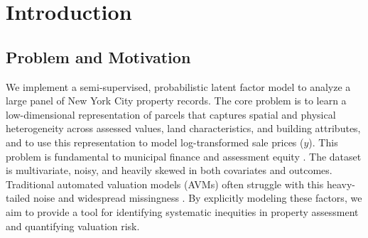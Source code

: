 \documentclass{article}
\begin{document}

\begin{abstract}
This project addresses the problem of urban property valuation in the presence of pervasive missingness and heavy-tailed noise. Accurate, uncertainty-aware valuations are critical for equitable property taxation and urban planning, as they help identify systematic assessment errors that may disproportionately affect specific neighborhoods. Our strategy involves implementing a semi-supervised extension of the Missing-data Importance-Weighted Autoencoder (MIWAE), trained on 120,000 New York City properties. We employ a mixture of Student-$t$ priors over the latent variables to accommodate the multimodality and extreme residuals characteristic of real estate data. Results show that this probabilistic framework yields informative point predictions while providing uncertainty estimates and interpretable latent structures. Quantitatively, we benchmark the generative model against gradient-boosted trees using held-out predictive metrics. Qualitatively, we visualize the latent variables to interpret the discovered structure. The broader aim is to demonstrate that principled probabilistic modeling offers distinct advantages over standard supervised approaches for auditing assessment fairness in noisy, complex urban environments.
\end{abstract}

\section{Introduction}

\subsection{Problem and Motivation}

We implement a semi-supervised, probabilistic latent factor model to analyze a large panel of New York City property records. The core problem is to learn a low-dimensional representation of parcels that captures spatial and physical heterogeneity across assessed values, land characteristics, and building attributes, and to use this representation to model log-transformed sale prices ($y$). This problem is fundamental to municipal finance and assessment equity \cite{iaao2013standard}. The dataset is multivariate, noisy, and heavily skewed in both covariates and outcomes. Traditional automated valuation models (AVMs) often struggle with this heavy-tailed noise and widespread missingness \cite{berry1975hedonic, zhou2023ai}. By explicitly modeling these factors, we aim to provide a tool for identifying systematic inequities in property assessment and quantifying valuation risk.
\end{document}
